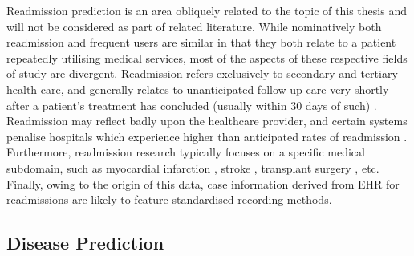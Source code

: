 

Readmission prediction is an area obliquely related to the topic of this thesis and will not be considered as part of related literature. While nominatively both readmission and frequent users are similar in that they both relate to a patient repeatedly utilising medical services, most of the aspects of these respective fields of study are divergent. Readmission refers exclusively to secondary and tertiary health care, and generally relates to unanticipated follow-up care very shortly after a patient's treatment has concluded (usually within 30 days of such) \cite{brudvik2015definition}. Readmission may reflect badly upon the healthcare provider, and certain systems penalise hospitals which experience higher than anticipated rates of readmission \cite{fonarow2017hospital}. Furthermore, readmission research typically focuses on a specific medical subdomain, such as myocardial infarction \cite{kociol2012international}, stroke \cite{boehme2018infections}, transplant surgery \cite{covert2016predicting}, etc. Finally, owing to the origin of this data, case information derived from EHR for readmissions are likely to feature standardised recording methods.        


\subsection{Disease Prediction }

